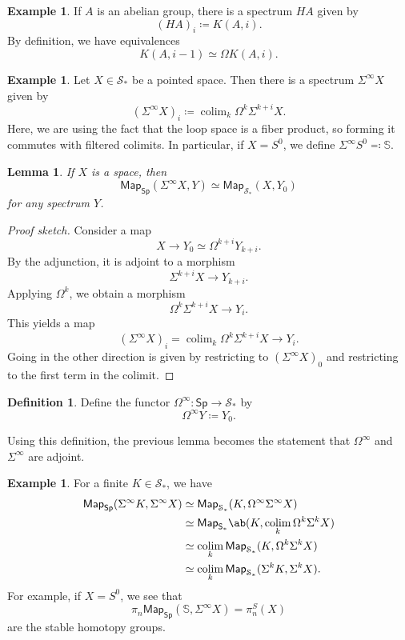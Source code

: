 \documentclass[10pt]{amsart}
\newtheorem{lem}[thm]{Lemma}
\theoremstyle{definition}
\newtheorem{defn}[thm]{Definition}
\newtheorem{exm}[thm]{Example}
\theoremstyle{remark}
\theoremstyle{plain}
\theoremstyle{definition}
\theoremstyle{remark}
\newcommand{\bS}{\mathbb{S}}
\newcommand{\mc}[1]{\mathcal{#1}}
\newcommand{\ms}[1]{\mathsf{#1}}
\newcommand{\1}{\mathbf{1}}
\newcommand{\2}{\mathbf{2}}
\newcommand{\3}{\mathbf{3}}
\DeclareMathOperator*{\colim}{colim}
\begin{document}
\begin{exm}
    If $A$ is an abelian group, there is a spectrum $HA$ given by
    \[ (HA)_i \coloneqq K(A, i). \]
    By definition, we have equivalences
    \[ K(A, i-1) \simeq \Omega K(A, i). \]
\end{exm}

\begin{exm}
    Let $X \in \mc{S}_*$ be a pointed space. Then there is a spectrum $\Sigma^{\infty} X$ given by
    \[ (\Sigma^{\infty}X)_i \coloneqq \colim_k \Omega^k \Sigma^{k+i} X. \]
    Here, we are using the fact that the loop space is a fiber product, so forming it commutes with filtered colimits. In particular, if $X = S^0$, we define $\Sigma^{\infty} S^0 \eqqcolon \bS$.
\end{exm}

\begin{lem}
    If $X$ is a space, then
    \[ \ms{Map}_{\ms{Sp}}(\Sigma^{\infty} X, Y) \simeq \ms{Map}_{\mc{S}_*} (X, Y_0) \]
    for any spectrum $Y$.
\end{lem}

\begin{proof}[Proof sketch]
    Consider a map
    \[ X \to Y_0 \simeq \Omega^{k+i} Y_{k+i}. \]
    By the adjunction, it is adjoint to a morphism
    \[ \Sigma^{k+i} X \to Y_{k+i}. \]
    Applying $\Omega^k$, we obtain a morphism
    \[ \Omega^k \Sigma^{k+i} X \to Y_i. \]
    This yields a map
    \[ (\Sigma^{\infty} X)_i = \colim_k \Omega^k \Sigma^{k+i} X \to Y_i. \]
    Going in the other direction is given by restricting to $(\Sigma^{\infty} X)_0$ and restricting to the first term in the colimit.
\end{proof}

\begin{defn}
    Define the functor $\Omega^{\infty} \colon \ms{Sp} \to \mc{S}_*$ by
    \[ \Omega^{\infty} Y \coloneqq Y_0. \]
\end{defn}

Using this definition, the previous lemma becomes the statement that $\Omega^{\infty}$ and $\Sigma^{\infty}$ are adjoint.

\begin{exm}
    For a finite $K \in \mc{S}_*$, we have
    \begin{align*}
        \ms{Map}_{\ms{Sp}}(\Sigma^{\infty} K, \Sigma^{\infty} X) &\simeq \ms{Map}_{\mc{S}_*}(K, \Omega^{\infty} \Sigma^{\infty} X) \\
        &\simeq \ms{Map}_{\ms{S}_*} \ab(K, \colim_k \Omega^k\Sigma^k X) \\
        &\simeq \colim_k \ms{Map}_{\mc{S}_*} (K, \Omega^k \Sigma^k X) \\
        &\simeq \colim_k \ms{Map}_{\mc{S}_*} (\Sigma^k K, \Sigma^k X).
    \end{align*}
    For example, if $X = S^0$, we see that
    \[ \pi_n \ms{Map}_{\ms{Sp}}(\bS, \Sigma^{\infty} X) = \pi_n^S(X) \]
    are the stable homotopy groups.
\end{exm}
\end{document}
